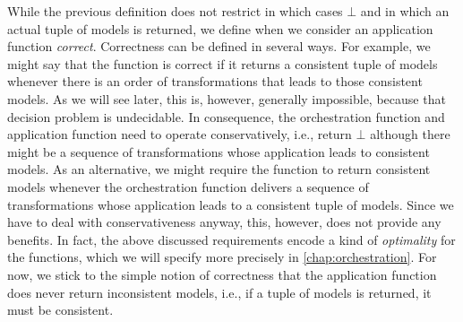 While the previous definition does not restrict in which cases $\bot$ and in which an actual tuple of models is returned, we define when we consider an application function \emph{correct}.
Correctness can be defined in several ways.
For example, we might say that the function is correct if it returns a consistent tuple of models whenever there is an order of transformations that leads to those consistent models.
As we will see later, this is, however, generally impossible, because that decision problem is undecidable.
In consequence, the orchestration function and application function need to operate conservatively, i.e., return $\bot$ although there might be a sequence of transformations whose application leads to consistent models.
As an alternative, we might require the function to return consistent models whenever the orchestration function delivers a sequence of transformations whose application leads to a consistent tuple of models.
Since we have to deal with conservativeness anyway, this, however, does not provide any benefits.
In fact, the above discussed requirements encode a kind of \emph{optimality} for the functions, which we will specify more precisely in \autoref{chap:orchestration}.
For now, we stick to the simple notion of correctness that the application function does never return inconsistent models, i.e., if a tuple of models is returned, it must be consistent.

